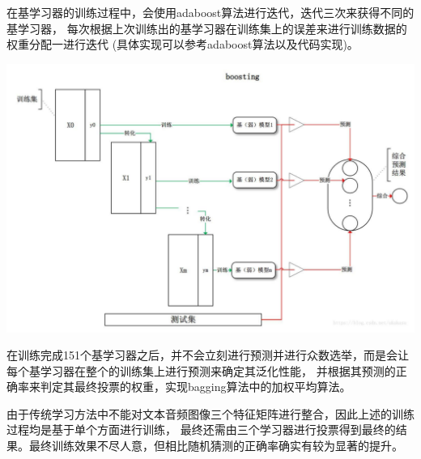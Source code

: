 \documentclass[11pt]{article}
\begin{document}
            在基学习器的训练过程中，会使用adaboost算法进行迭代，迭代三次来获得不同的基学习器，
            每次根据上次训练出的基学习器在训练集上的误差来进行训练数据的权重分配一进行迭代
            (具体实现可以参考adaboost算法以及代码实现)。
            \begin{center}
                \includegraphics[scale = 1.1]{graph/tradition2.png}
            \end{center}

            在训练完成151个基学习器之后，并不会立刻进行预测并进行众数选举，而是会让每个基学习器在整个的训练集上进行预测来确定其泛化性能，
            并根据其预测的正确率来判定其最终投票的权重，实现bagging算法中的加权平均算法。

            由于传统学习方法中不能对文本音频图像三个特征矩阵进行整合，因此上述的训练过程均是基于单个方面进行训练，
            最终还需由三个学习器进行投票得到最终的结果。最终训练效果不尽人意，但相比随机猜测的正确率确实有较为显著的提升。
\end{document}
